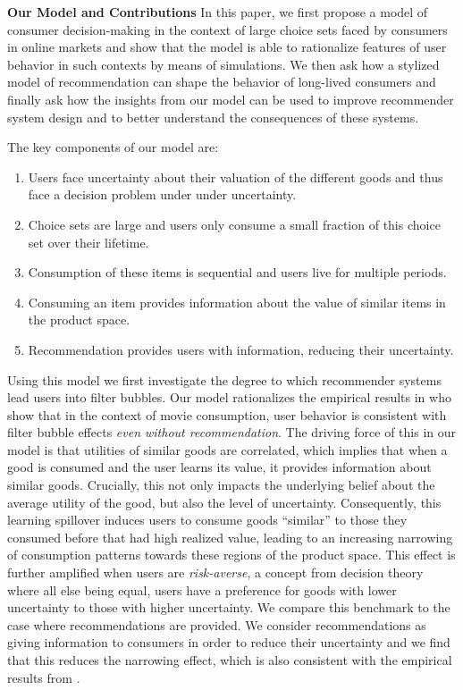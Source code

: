 \documentclass[sigconf, anonymous, review]{acmart}
\begin{document}
\textbf{Our Model and Contributions} In this paper, 
we first propose a model of consumer decision-making in the context of large choice sets faced by consumers in online markets and show that the model is able to rationalize features of user behavior in such contexts by means of simulations. 
We then ask how a stylized model of recommendation can shape the behavior of long-lived consumers 
and finally ask how the insights from our model can be used to improve recommender system design and to better understand the consequences of these systems.
\par

The key components of our model are:
\begin{enumerate}[label=(\arabic*)]
\item Users face uncertainty about their valuation of the different goods and thus face a decision problem under under uncertainty.
\item Choice sets are large and users only consume a small fraction of this choice set over their lifetime.
\item Consumption of these items is sequential and users live for multiple periods.
\item Consuming an item provides information about the value of similar items in the product space.
\item Recommendation provides users with information, reducing their uncertainty.
\end{enumerate}

Using this model we first investigate the degree to which recommender systems lead users into filter bubbles. Our model rationalizes the empirical results in \cite{nguyen2014exploring} who show that in the context of movie consumption, user behavior is consistent with filter bubble effects \textit{even without recommendation}. The driving force of this in our model is that utilities of similar goods are correlated, which implies that when a good is consumed and the user learns its value, it provides information about similar goods. Crucially, this not only impacts the underlying belief about the average utility of the good, but also the level of uncertainty. Consequently, this learning spillover induces users to consume goods ``similar'' to those they consumed before that had high realized value, leading to an increasing narrowing of consumption patterns towards these regions of the product space. This effect is further amplified when users are \textit{risk-averse}, a concept from decision theory where all else being equal, users have a preference for goods with lower uncertainty to those with higher uncertainty.
We compare this benchmark to the case where recommendations are provided. We consider recommendations as giving information to consumers in order to reduce their uncertainty and we find that this reduces the narrowing effect, which is also consistent with the empirical results from \cite{nguyen2014exploring}.
\par
\end{document}
